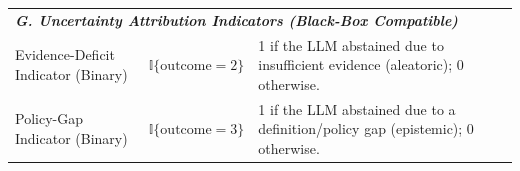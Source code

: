 \begin{table}[t]
\begin{tabular}{p{4.0cm} p{4.8cm} p{8.2cm}}
\midrule
\multicolumn{3}{l}{\textit{\textbf{G. Uncertainty Attribution Indicators (Black-Box Compatible)}}} \\
\hdashline
Evidence-Deficit Indicator (Binary) &
$\mathbb{I}\{\text{outcome} = 2\}$ &
1 if the LLM abstained due to insufficient evidence (aleatoric); 0 otherwise. \\
Policy-Gap Indicator (Binary) &
$\mathbb{I}\{\text{outcome} = 3\}$ &
1 if the LLM abstained due to a definition/policy gap (epistemic); 0 otherwise. \\
\bottomrule
\end{tabular}
\label{app:full_lpps}
\end{table}